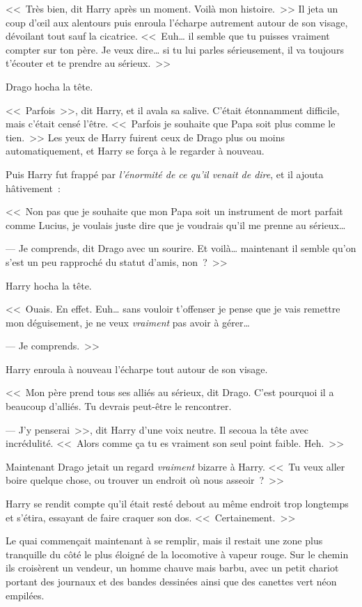 <<~Très bien, dit Harry après un moment. Voilà mon histoire.~>> Il jeta un coup d'œil aux alentours puis enroula l'écharpe autrement autour de son visage, dévoilant tout sauf la cicatrice. <<~Euh… il semble que tu puisses vraiment compter sur ton père. Je veux dire… si tu lui parles sérieusement, il va toujours t'écouter et te prendre au sérieux.~>>

Drago hocha la tête.

<<~Parfois~>>, dit Harry, et il avala sa salive. C'était étonnamment difficile, mais c'était censé l'être. <<~Parfois je souhaite que Papa soit plus comme le tien.~>> Les yeux de Harry fuirent ceux de Drago plus ou moins automatiquement, et Harry se força à le regarder à nouveau.

Puis Harry fut frappé par \emph{l'énormité de ce qu'il venait de dire}, et il ajouta hâtivement~:

<<~Non pas que je souhaite que mon Papa soit un instrument de mort parfait comme Lucius, je voulais juste dire que je voudrais qu'il me prenne au sérieux…

--- Je comprends, dit Drago avec un sourire. Et voilà… maintenant il semble qu'on s'est un peu rapproché du statut d'amis, non~?~>>

Harry hocha la tête.

<<~Ouais. En effet. Euh… sans vouloir t'offenser je pense que je vais remettre mon déguisement, je ne veux \emph{vraiment} pas avoir à gérer…

--- Je comprends.~>>

Harry enroula à nouveau l'écharpe tout autour de son visage.

<<~Mon père prend tous ses alliés au sérieux, dit Drago. C'est pourquoi il a beaucoup d'alliés. Tu devrais peut-être le rencontrer.

--- J'y penserai~>>, dit Harry d'une voix neutre. Il secoua la tête avec incrédulité. <<~Alors comme ça tu es vraiment son seul point faible. Heh.~>>

Maintenant Drago jetait un regard \emph{vraiment} bizarre à Harry. <<~Tu veux aller boire quelque chose, ou trouver un endroit où nous asseoir~?~>>

Harry se rendit compte qu'il était resté debout au même endroit trop longtemps et s'étira, essayant de faire craquer son dos. <<~Certainement.~>>

Le quai commençait maintenant à se remplir, mais il restait une zone plus tranquille du côté le plus éloigné de la locomotive à vapeur rouge. Sur le chemin ils croisèrent un vendeur, un homme chauve mais barbu, avec un petit chariot portant des journaux et des bandes dessinées ainsi que des canettes vert néon empilées.

